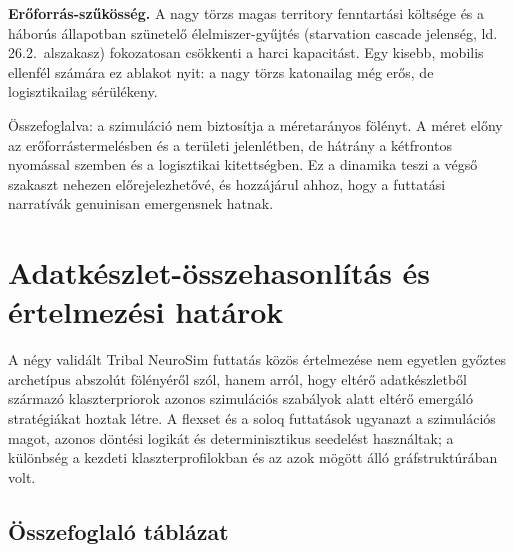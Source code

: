 ﻿\documentclass[a4paper,12pt]{report}
\begin{document}
\textbf{Erőforrás-szűkösség.} A nagy törzs magas territory fenntartási költsége
és a háborús állapotban szünetelő élelmiszer-gyűjtés (starvation cascade jelenség,
ld. 26.2.~alszakasz) fokozatosan csökkenti a harci kapacitást. Egy kisebb, mobilis
ellenfél számára ez ablakot nyit: a nagy törzs katonailag még erős, de logisztikailag
sérülékeny.

Összefoglalva: a szimuláció nem biztosítja a méretarányos fölényt. A méret
előny az erőforrástermelésben és a területi jelenlétben, de hátrány a
kétfrontos nyomással szemben és a logisztikai kitettségben. Ez a dinamika
teszi a végső szakaszt nehezen előrejelezhetővé, és hozzájárul ahhoz, hogy
a futtatási narratívák genuinisan emergensnek hatnak.

\section{Adatkészlet-összehasonlítás és értelmezési határok}
\label{sec:neurosim-26-conclusions}

A négy validált Tribal NeuroSim futtatás közös értelmezése nem egyetlen győztes archetípus abszolút fölényéről szól, hanem arról, hogy eltérő adatkészletből származó klaszterpriorok azonos szimulációs szabályok alatt eltérő emergáló stratégiákat hoztak létre. A flexset és a soloq futtatások ugyanazt a szimulációs magot, azonos döntési logikát és determinisztikus seedelést használtak; a különbség a kezdeti klaszterprofilokban és az azok mögött álló gráfstruktúrában volt.

\subsection*{Összefoglaló táblázat}

\begin{table}[h]
\centering
\small
\caption{A négy záró Tribal NeuroSim futtatás összehasonlítása}
\label{tab:neurosim-run-comparison-final}
\end{table}
\end{document}
